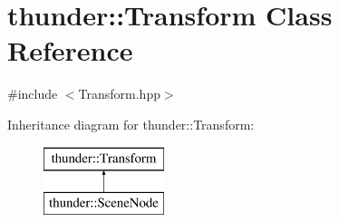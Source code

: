 \hypertarget{classthunder_1_1_transform}{}\section{thunder\+:\+:Transform Class Reference}
\label{classthunder_1_1_transform}


{\ttfamily \#include $<$Transform.\+hpp$>$}

Inheritance diagram for thunder\+:\+:Transform\+:\begin{figure}[H]
\begin{center}
\leavevmode
\includegraphics[height=2.000000cm]{classthunder_1_1_transform}
\end{center}
\end{figure}
